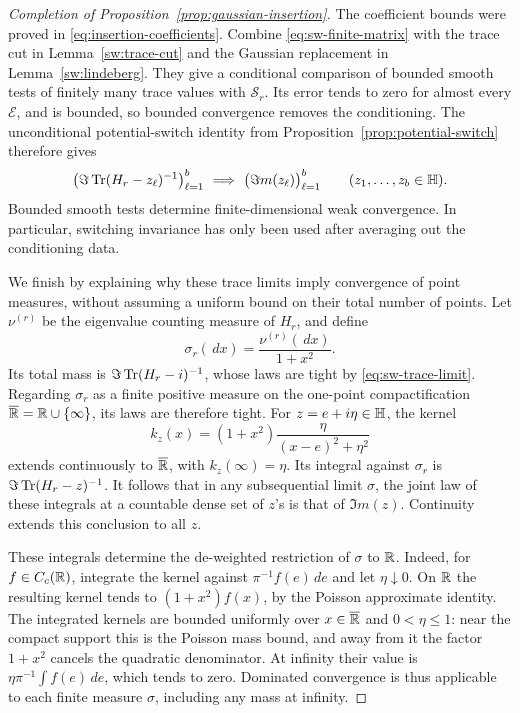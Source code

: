 \begin{proof}[Completion of Proposition~\ref{prop:gaussian-insertion}]
The coefficient bounds were proved in \eqref{eq:insertion-coefficients}.
Combine \eqref{eq:sw-finite-matrix} with the trace cut in
Lemma~\ref{sw:trace-cut} and the Gaussian replacement in
Lemma~\ref{sw:lindeberg}. They give a conditional comparison of bounded
smooth tests of finitely many trace values with \(\mathcal S_r\).
Its error tends to zero for almost every \(\mathcal E\), and is bounded,
so bounded convergence removes the conditioning. The unconditional
potential-switch identity from Proposition~\ref{prop:potential-switch}
therefore gives
\begin{equation}\label{eq:sw-trace-limit}
 \bigl(\Im\operatorname{Tr}(H_r-z_\ell)^{-1}\bigr)_{\ell=1}^b
   \ \Longrightarrow\
 \bigl(\Im m(z_\ell)\bigr)_{\ell=1}^b
 \qquad(z_1,\ldots,z_b\in\mathbb H).
\end{equation}
Bounded smooth tests determine finite-dimensional weak convergence.
In particular, switching invariance has only been used after averaging
out the conditioning data.

We finish by explaining why these trace limits imply convergence of point
measures, without assuming a uniform bound on their total number of
points. Let \(\nu^{(r)}\) be the eigenvalue counting measure of \(H_r\), and
define
\[
 \sigma_r(\,d x)=\frac{\nu^{(r)}(\,d x)}{1+x^2}.
\]
Its total mass is \(\Im\operatorname{Tr}(H_r-i)^{-1}\), whose laws are tight by
\eqref{eq:sw-trace-limit}. Regarding \(\sigma_r\) as a finite positive
measure on the one-point compactification
\(\overline{\mathbb R}=\mathbb R\cup\{\infty\}\), its laws are therefore tight.
For \(z=e+i\eta\in\mathbb H\), the kernel
\[
 k_z(x)=(1+x^2)\frac{\eta}{(x-e)^2+\eta^2}
\]
extends continuously to \(\overline{\mathbb R}\), with \(k_z(\infty)=\eta\).
Its integral against \(\sigma_r\) is \(\Im\operatorname{Tr}(H_r-z)^{-1}\).
It follows that in any subsequential limit \(\sigma\), the joint law of
these integrals at a countable dense set of \(z\)'s is that of
\(\Im m(z)\). Continuity extends this conclusion to all \(z\).

These integrals determine the de-weighted restriction of \(\sigma\) to
\(\mathbb R\). Indeed, for \(f\in C_c(\mathbb R)\), integrate the kernel against
\(\pi^{-1}f(e)\,d e\) and let \(\eta\downarrow0\). On \(\mathbb R\) the resulting
kernel tends to \((1+x^2)f(x)\), by the Poisson approximate identity.
The integrated kernels are bounded uniformly over
\(x\in\overline{\mathbb R}\) and \(0<\eta\le1\): near the compact support this is
the Poisson mass bound, and away from it the factor \(1+x^2\) cancels
the quadratic denominator. At infinity their value is
\(\eta\pi^{-1}\int f(e)\,d e\), which tends to zero.
Dominated convergence is thus applicable to each finite measure
\(\sigma\), including any mass at infinity.


\end{proof}
